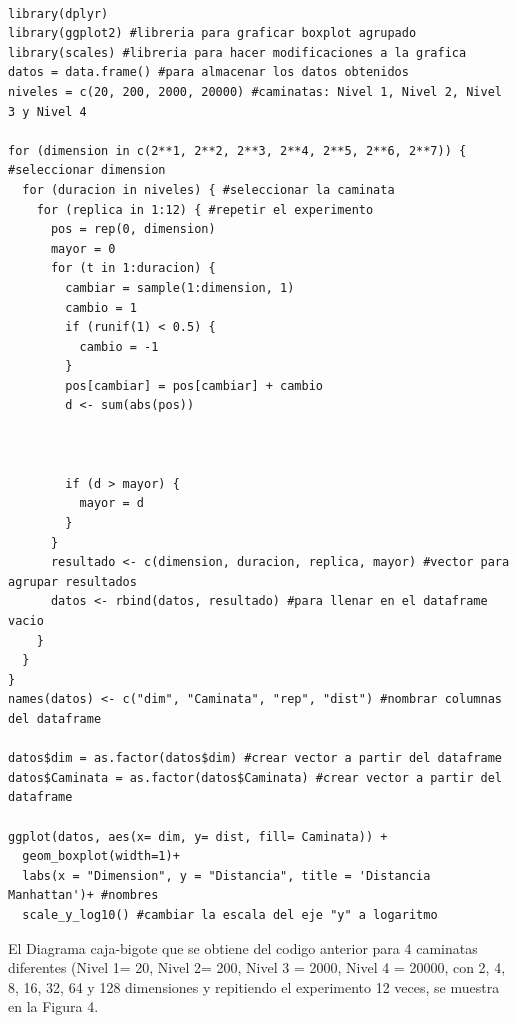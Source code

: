 \documentclass{article}
\begin{document}
\begin{lstlisting}

library(dplyr) 
library(ggplot2) #libreria para graficar boxplot agrupado
library(scales) #libreria para hacer modificaciones a la grafica
datos = data.frame() #para almacenar los datos obtenidos
niveles = c(20, 200, 2000, 20000) #caminatas: Nivel 1, Nivel 2, Nivel 3 y Nivel 4

for (dimension in c(2**1, 2**2, 2**3, 2**4, 2**5, 2**6, 2**7)) { #seleccionar dimension
  for (duracion in niveles) { #seleccionar la caminata
    for (replica in 1:12) { #repetir el experimento
      pos = rep(0, dimension)
      mayor = 0
      for (t in 1:duracion) {
        cambiar = sample(1:dimension, 1)
        cambio = 1
        if (runif(1) < 0.5) {
          cambio = -1
        }
        pos[cambiar] = pos[cambiar] + cambio
        d <- sum(abs(pos))
        
        
        
        if (d > mayor) {
          mayor = d
        }
      }
      resultado <- c(dimension, duracion, replica, mayor) #vector para agrupar resultados
      datos <- rbind(datos, resultado) #para llenar en el dataframe vacio
    }
  }
}
names(datos) <- c("dim", "Caminata", "rep", "dist") #nombrar columnas del dataframe 

datos$dim = as.factor(datos$dim) #crear vector a partir del dataframe
datos$Caminata = as.factor(datos$Caminata) #crear vector a partir del dataframe

ggplot(datos, aes(x= dim, y= dist, fill= Caminata)) + 
  geom_boxplot(width=1)+
  labs(x = "Dimension", y = "Distancia", title = 'Distancia Manhattan')+ #nombres
  scale_y_log10() #cambiar la escala del eje "y" a logaritmo

\end{lstlisting}
\bigskip

El Diagrama caja-bigote que se obtiene del codigo anterior para 4 caminatas diferentes (Nivel 1= 20, Nivel 2= 200, Nivel 3 = 2000, Nivel 4 = 20000, con 2, 4, 8, 16, 32, 64 y 128 dimensiones y repitiendo el experimento 12 veces, se muestra en la Figura 4.
\end{document}
